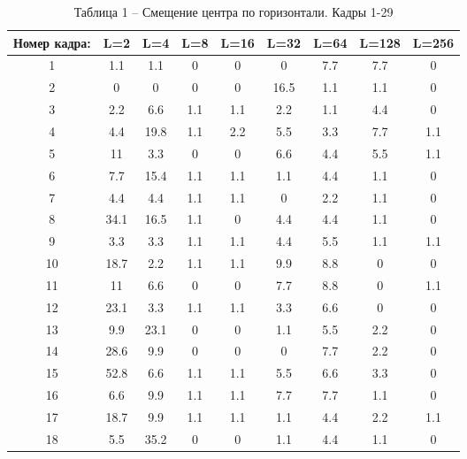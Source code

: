 \begin{table}[h!]
\caption*{Таблица 1 -- Смещение центра по горизонтали. Кадры 1-29}
\begin{tabular}{|c|c|c|c|c|c|c|c|c|}
\hline
Номер кадра: & L=2   & L=4   & L=8   & L=16  & L=32  & L=64 & L=128 & L=256 \\ \hline
1            & 1.1   & 1.1   & 0     & 0     & 0     & 7.7  & 7.7   & 0     \\ \hline
2            & 0     & 0     & 0     & 0     & 16.5  & 1.1  & 1.1   & 0     \\ \hline
3            & 2.2   & 6.6   & 1.1   & 1.1   & 2.2   & 1.1  & 4.4   & 0     \\ \hline
4            & 4.4   & 19.8  & 1.1   & 2.2   & 5.5   & 3.3  & 7.7   & 1.1   \\ \hline
5            & 11    & 3.3   & 0     & 0     & 6.6   & 4.4  & 5.5   & 1.1   \\ \hline
6            & 7.7   & 15.4  & 1.1   & 1.1   & 1.1   & 4.4  & 1.1   & 0     \\ \hline
7            & 4.4   & 4.4   & 1.1   & 1.1   & 0     & 2.2  & 1.1   & 0     \\ \hline
8            & 34.1  & 16.5  & 1.1   & 0     & 4.4   & 4.4  & 1.1   & 0     \\ \hline
9            & 3.3   & 3.3   & 1.1   & 1.1   & 4.4   & 5.5  & 1.1   & 1.1   \\ \hline
10           & 18.7  & 2.2   & 1.1   & 1.1   & 9.9   & 8.8  & 0     & 0     \\ \hline
11           & 11    & 6.6   & 0     & 0     & 7.7   & 8.8  & 0     & 1.1   \\ \hline
12           & 23.1  & 3.3   & 1.1   & 1.1   & 3.3   & 6.6  & 0     & 0     \\ \hline
13           & 9.9   & 23.1  & 0     & 0     & 1.1   & 5.5  & 2.2   & 0     \\ \hline
14           & 28.6  & 9.9   & 0     & 0     & 0     & 7.7  & 2.2   & 0     \\ \hline
15           & 52.8  & 6.6   & 1.1   & 1.1   & 5.5   & 6.6  & 3.3   & 0     \\ \hline
16           & 6.6   & 9.9   & 1.1   & 1.1   & 7.7   & 7.7  & 1.1   & 0     \\ \hline
17           & 18.7  & 9.9   & 1.1   & 1.1   & 1.1   & 4.4  & 2.2   & 1.1   \\ \hline
18           & 5.5   & 35.2  & 0     & 0     & 1.1   & 4.4  & 1.1   & 0     \\ \hline

\end{tabular}
\end{table}
